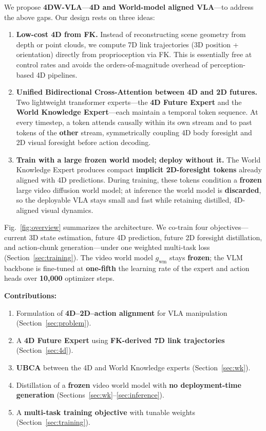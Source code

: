We propose \textbf{4DW-VLA}---\textbf{4D and World-model aligned VLA}---to address the above gaps. Our design rests on three ideas:
\begin{enumerate}
\item \textbf{Low-cost 4D from FK.} Instead of reconstructing scene geometry from depth or point clouds, we compute 7D link trajectories (3D position + orientation) directly from proprioception via FK. This is essentially free at control rates and avoids the orders-of-magnitude overhead of perception-based 4D pipelines.
\item \textbf{Unified Bidirectional Cross-Attention between 4D and 2D futures.} Two lightweight transformer experts---the \textbf{4D Future Expert} and the \textbf{World Knowledge Expert}---each maintain a temporal token sequence. At every timestep, a token attends causally within its own stream and to past tokens of the \textbf{other} stream, symmetrically coupling 4D body foresight and 2D visual foresight before action decoding.
\item \textbf{Train with a large frozen world model; deploy without it.} The World Knowledge Expert produces compact \textbf{implicit 2D-foresight tokens} already aligned with 4D predictions. During training, these tokens condition a \textbf{frozen} large video diffusion world model; at inference the world model is \textbf{discarded}, so the deployable VLA stays small and fast while retaining distilled, 4D-aligned visual dynamics.
\end{enumerate}

Fig.~\ref{fig:overview} summarizes the architecture. We co-train four objectives---current 3D state estimation, future 4D prediction, future 2D foresight distillation, and action-chunk generation---under one weighted multi-task loss (Section~\ref{sec:training}). The video world model $g_{\mathrm{wm}}$ stays \textbf{frozen}; the VLM backbone is fine-tuned at \textbf{one-fifth} the learning rate of the expert and action heads over \textbf{10{,}000} optimizer steps.

\textbf{Contributions:}
\begin{enumerate}
\item Formulation of \textbf{4D--2D--action alignment} for VLA manipulation (Section~\ref{sec:problem}).
\item A \textbf{4D Future Expert} using \textbf{FK-derived 7D link trajectories} (Section~\ref{sec:4d}).
\item \textbf{UBCA} between the 4D and World Knowledge experts (Section~\ref{sec:wk}).
\item Distillation of a \textbf{frozen} video world model with \textbf{no deployment-time generation} (Sections~\ref{sec:wk}--\ref{sec:inference}).
\item A \textbf{multi-task training objective} with tunable weights (Section~\ref{sec:training}).
\end{enumerate}

